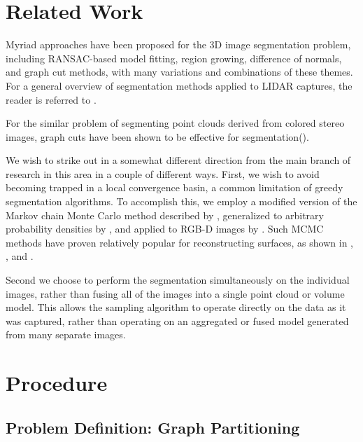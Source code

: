 \documentclass[10pt,letterpaper]{article}
\begin{document}
\section{Related Work}
	Myriad approaches have been proposed for the 3D image segmentation problem, including RANSAC-based model fitting, region growing, difference of normals, and graph cut methods, with many variations and combinations of these themes. For a general overview of segmentation methods applied to LIDAR captures, the reader is referred to \cite{douillard2011segmentation}. 
	
	For the similar problem of segmenting point clouds derived from colored stereo images, graph cuts have been shown to be effective for segmentation(\cite{bleyer2005graph}).

	
	We wish to strike out in a somewhat different direction from the main branch of research in this area in a couple of different ways. First, we wish to avoid becoming trapped in a local convergence basin, a common limitation of greedy segmentation algorithms. To accomplish this, we employ a modified version of the Markov chain Monte Carlo method described by \cite{swendsen1987nonuniversal}, generalized to arbitrary probability densities by \cite{barbu2005generalizing}, and applied to RGB-D images by \cite{Erdogan12crv}. Such MCMC methods have proven relatively popular for reconstructing surfaces, as shown in \cite{tu2002image}, \cite{qiu2009jump}, and 	\cite{dick2002bayesian}.
	
	Second we choose to perform the segmentation simultaneously on the individual images, rather than fusing all of the images into a single point cloud or volume model. This allows the sampling algorithm to operate directly on the data as it was captured, rather than operating on an aggregated or fused model generated from many separate images.
	
	
	



\section{Procedure}

\subsection{Problem Definition: Graph Partitioning}
\end{document}
